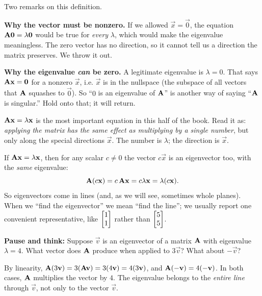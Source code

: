Two remarks on this definition.

\textbf{Why the vector must be nonzero.} If we allowed $\vec{x}=\vec{0}$, the
equation $\mathbf{A}\mathbf{0}=\lambda\mathbf{0}$ would be true for \emph{every} $\lambda$,
which would make the eigenvalue meaningless. The zero vector has no direction, so
it cannot tell us a direction the matrix preserves. We throw it out.

\textbf{Why the eigenvalue \emph{can} be zero.} A legitimate eigenvalue is
$\lambda=0$. That says $\mathbf{A}\mathbf{x}=\mathbf{0}$ for a nonzero $\vec{x}$, i.e.
$\vec{x}$ is in the nullspace (the subspace of all vectors that $\mathbf{A}$ squashes to $\vec{0}$).
So ``$0$ is an eigenvalue of $\mathbf{A}$'' is another way of saying ``$\mathbf{A}$ is singular.''
Hold onto that; it will return.

\begin{focusbox}
$\mathbf{A}\mathbf{x}=\lambda\mathbf{x}$ is the most important equation in this half of the
book. Read it as: \emph{applying the matrix has the same effect as multiplying by
a single number}, but only along the special directions $\vec{x}$. The number is
$\lambda$; the direction is $\vec{x}$.
\end{focusbox}

\begin{remark}
\label{ch23:rem-scaling}
If $\mathbf{A}\mathbf{x}=\lambda\mathbf{x}$, then for any scalar $c\neq 0$ the vector
$c\vec{x}$ is an eigenvector too, with the \emph{same} eigenvalue:
\[
  \mathbf{A}(c\mathbf{x})=c\,\mathbf{A}\mathbf{x}=c\lambda\mathbf{x}=\lambda(c\mathbf{x}).
\]
So eigenvectors come in lines (and, as we will see, sometimes whole planes). When we
``find the eigenvector'' we mean ``find the line''; we usually report one
convenient representative, like $\begin{bmatrix}1\\1\end{bmatrix}$ rather than $\begin{bmatrix}5\\5\end{bmatrix}$.
\end{remark}

\begin{recoverybox}
\textbf{Pause and think:} Suppose $\vec{v}$ is an eigenvector of a matrix $\mathbf{A}$ with eigenvalue $\lambda=4$. What vector does $\mathbf{A}$ produce when applied to $3\vec{v}$? What about $-\vec{v}$?
\vspace{0.3em}

By linearity, $\mathbf{A}(3\mathbf{v}) = 3(\mathbf{A}\mathbf{v}) = 3(4\mathbf{v}) = 4(3\mathbf{v})$, and $\mathbf{A}(-\mathbf{v}) = 4(-\mathbf{v})$. In both cases, $\mathbf{A}$ multiplies the vector by $4$. The eigenvalue belongs to the \emph{entire line} through $\vec{v}$, not only to the vector $\vec{v}$.
\end{recoverybox}

